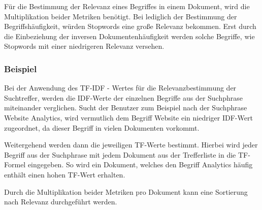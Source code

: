 Für die Bestimmung der Relevanz eines Begriffes in einem Dokument, wird die Multiplikation beider Metriken benötigt. Bei lediglich der Bestimmung der Begriffshäufigkeit, würden Stopwords eine große Relevanz bekommen. Erst durch die Einbeziehung der inversen Dokumentenhäufigkeit werden solche Begriffe, wie Stopwords mit einer niedrigeren Relevanz versehen.

\subsubsection{Beispiel}

Bei der Anwendung des TF-IDF - Wertes für die Relevanzbestimmung der Suchtreffer, werden die IDF-Werte der einzelnen Begriffe aus der Suchphrase miteinander verglichen. Sucht der Benutzer zum Beispiel nach der Suchphrase \glqq Website Analytics\grqq{}, wird vermutlich dem Begriff \glqq Website\grqq{} ein niedriger IDF-Wert zugeordnet, da dieser Begriff in vielen Dokumenten vorkommt.

Weitergehend werden dann die jeweiligen TF-Werte bestimmt. Hierbei wird jeder Begriff aus der Suchphrase mit jedem Dokument aus der Trefferliste in die TF-Formel eingegeben. So wird ein Dokument, welches den Begriff \glqq Analytics\grqq{} häufig enthält einen hohen TF-Wert erhalten.

Durch die Multiplikation beider Metriken pro Dokument kann eine Sortierung nach Relevanz durchgeführt werden.
